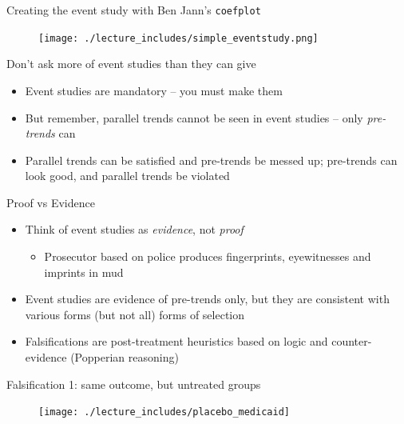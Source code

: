 \documentclass{beamer}
\begin{document}
\begin{frame}{Creating the event study with Ben Jann's \texttt{coefplot}}

	\begin{figure}
	\texttt{[image: ./lecture\_includes/simple\_eventstudy.png]}
	\end{figure}

\end{frame}


\begin{frame}{Don't ask more of event studies than they can give}

\begin{itemize}
\item Event studies are mandatory -- you must make them
\item But remember, parallel trends cannot be seen in event studies -- only \emph{pre-trends} can
\item Parallel trends can be satisfied and pre-trends be messed up; pre-trends can look good, and parallel trends be violated

\end{itemize}
\end{frame}

\begin{frame}{Proof vs Evidence}

\begin{itemize}
\item Think of event studies as \emph{evidence}, not \emph{proof}
	\begin{itemize}
	\item Prosecutor based on police produces fingerprints, eyewitnesses and imprints in mud
	\end{itemize}
\item Event studies are evidence of pre-trends only, but they are consistent with various forms (but not all) forms of selection
\item Falsifications are post-treatment heuristics based on logic and counter-evidence (Popperian reasoning)
\end{itemize}
\end{frame}



\begin{frame}{Falsification 1: same outcome, but untreated groups}
		
		\begin{figure}
		\texttt{[image: ./lecture\_includes/placebo\_medicaid]}
		\end{figure}

\end{frame}
\end{document}
